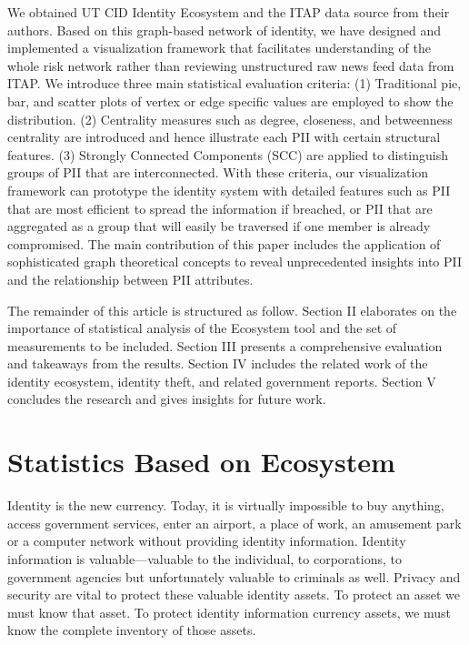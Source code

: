 \documentclass[conference]{IEEEtran}
\begin{document}
We obtained UT CID Identity Ecosystem and the ITAP data source from their authors. Based on this graph-based network of identity, we have designed and implemented a visualization framework that facilitates understanding of the whole risk network rather than reviewing unstructured raw news feed data from ITAP. We introduce three main statistical evaluation criteria: (1) Traditional pie, bar, and scatter plots of vertex or edge specific values are employed to show the distribution. (2) Centrality measures such as degree, closeness, and betweenness centrality are introduced and hence illustrate each PII with certain structural features. (3) Strongly Connected Components (SCC) are applied to distinguish groups of PII that are interconnected.  With these criteria, our visualization framework can prototype the identity system with detailed features such as PII that are most efficient to spread the information if breached, or PII that are aggregated as a group that will easily be traversed if one member is already compromised. The main contribution of this paper includes the application of sophisticated graph theoretical concepts to reveal unprecedented insights into PII and the relationship between PII attributes.

The remainder of this article is structured as follow. Section II elaborates on the importance of statistical analysis of the Ecosystem tool and the set of measurements to be included. Section III presents a comprehensive evaluation and takeaways from the results. Section IV includes the related work of the identity ecosystem, identity theft, and related government reports. Section V concludes the research and gives insights for future work.

\section{Statistics Based on Ecosystem}

Identity is the new currency. Today, it is virtually impossible to buy anything, access government services, enter an airport, a place of work, an amusement park or a computer network without providing identity information. Identity information is valuable–--valuable to the individual, to corporations, to government agencies but unfortunately valuable to criminals as well. Privacy and security are vital to protect these valuable identity assets. To protect an asset we must know that asset. To protect identity information currency assets, we must know the complete inventory of those assets.
\end{document}
